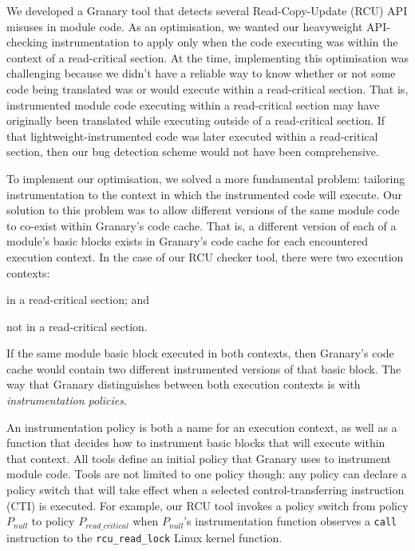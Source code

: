 \documentclass[preprint]{sigplanconf}
\begin{document}
We developed a Granary tool that detects several Read-Copy-Update (RCU) API misuses in module code. As an optimisation, we wanted our heavyweight API-checking instrumentation to apply only when the code executing was within the context of a read-critical section. At the time, implementing this optimisation was challenging because we didn't have a reliable way to know whether or not some code being translated was or would execute within a read-critical section. That is, instrumented module code executing within a read-critical section may have originally been translated while executing outside of a read-critical section. If that lightweight-instrumented code was later executed within a read-critical section, then our bug detection scheme would not have been comprehensive. 

To implement our optimisation, we solved a more fundamental problem: tailoring instrumentation to the context in which the instrumented code will execute. Our solution to this problem was to allow different versions of the same module code to co-exist within Granary's code cache. That is, a different version of each of a module's basic blocks exists in Granary's code cache  for each encountered execution context. In the case of our RCU checker tool, there were two execution contexts: \begin{inparaenum}[(1)]
	\item in a read-critical section; and
	\item not in a read-critical section.
\end{inparaenum} If the same module basic block executed in both contexts, then Granary's code cache would contain two different instrumented versions of that basic block. The way that Granary distinguishes between both execution contexts is with \emph{instrumentation policies}. 

An instrumentation policy is both a name for an execution context, as well as a function that decides how to instrument basic blocks that will execute within that context. All tools define an initial policy that Granary uses to instrument module code. Tools are not limited to one policy though: any policy can declare a policy switch that will take effect when a selected control-transferring instruction (CTI) is executed. For example, our RCU tool invokes a policy switch from policy $P_{null}$ to policy $P_{read\_critical}$ when $P_{null}$'s instrumentation function observes a \texttt{call} instruction to the \texttt{rcu\_read\_lock} Linux kernel function.
\end{document}
